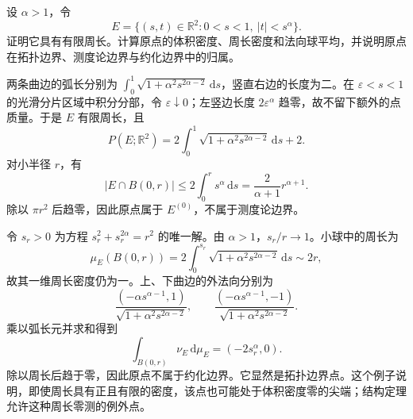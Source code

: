 \begin{exercise}\label{g3:ex:cusp-perimeter-density}
	设 \(\alpha>1\)，令
	\[
		E=\{(s,t)\in\mathbb R^2:0<s<1,\ |t|<s^\alpha\}.
	\]
	证明它具有有限周长。计算原点的体积密度、周长密度和法向球平均，并说明原点在拓扑边界、测度论边界与约化边界中的归属。
\end{exercise}
\begin{solution}
	两条曲边的弧长分别为
	\(\int_0^1\sqrt{1+\alpha^2s^{2\alpha-2}}\,\mathrm ds\)，竖直右边的长度为二。在 \(\varepsilon<s<1\) 的光滑分片区域中积分分部，令 \(\varepsilon\downarrow0\)；左竖边长度 \(2\varepsilon^\alpha\) 趋零，故不留下额外的点质量。于是 \(E\) 有限周长，且
	\[
		P(E;\mathbb R^2)
		=2\int_0^1\sqrt{1+\alpha^2s^{2\alpha-2}}\,\mathrm ds+2.
	\]
	对小半径 \(r\)，有
	\[
		|E\cap B(0,r)|
		\le 2\int_0^r s^\alpha\,\mathrm ds
		=\frac{2}{\alpha+1}r^{\alpha+1}.
	\]
	除以 \(\pi r^2\) 后趋零，因此原点属于 \(E^{(0)}\)，不属于测度论边界。

	令 \(s_r>0\) 为方程 \(s_r^2+s_r^{2\alpha}=r^2\) 的唯一解。由 \(\alpha>1\)，\(s_r/r\to1\)。小球中的周长为
	\[
		\mu_E(B(0,r))
		=2\int_0^{s_r}\sqrt{1+\alpha^2s^{2\alpha-2}}\,\mathrm ds
		\sim2r,
	\]
	故其一维周长密度仍为一。上、下曲边的外法向分别为
	\[
		\frac{(-\alpha s^{\alpha-1},1)}
		{\sqrt{1+\alpha^2s^{2\alpha-2}}},
		\qquad
		\frac{(-\alpha s^{\alpha-1},-1)}
		{\sqrt{1+\alpha^2s^{2\alpha-2}}}.
	\]
	乘以弧长元并求和得到
	\[
		\int_{B(0,r)}\nu_E\,\mathrm d\mu_E
		=(-2s_r^\alpha,0).
	\]
	除以周长后趋于零，因此原点不属于约化边界。它显然是拓扑边界点。这个例子说明，即使周长具有正且有限的密度，该点也可能处于体积密度零的尖端；结构定理允许这种周长零测的例外点。
\end{solution}

